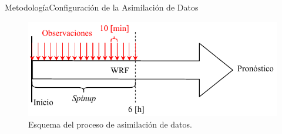 \documentclass[mathserif,10pt]{beamer}
\begin{document}
\begin{frame}{Metodología}{Configuración de la Asimilación de Datos}
	\begin{figure}[H]
		\centering
		\includegraphics[width=0.95\linewidth,page=1,trim={0cm 0cm 0cm 0cm},clip]{fig/05/da}%
		\caption{Esquema del proceso de asimilación de datos.}
		\label{fig:05_da}
	\end{figure}
\end{frame}
\end{document}
